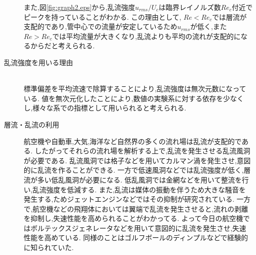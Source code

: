 \begin{description}
  また,図\ref{fig:graph2.eps}から,乱流強度$u_{rms}/U_c$は臨界レイノルズ数$Re_c$付近でピークを持っていることがわかる.
  この理由として, $Re<Re_c$では層流が支配的であり,管中心での流量が安定しているため$u_{rms}$が低く,また$Re>Re_c$では平均流量が大きくなり,乱流よりも平均の流れが支配的になるからだと考えられる.
  \item[乱流強度を用いる理由]\mbox{}\\
  標準偏差を平均流速で除算することにより,乱流強度は無次元数になっている.
  値を無次元化したことにより,数値の実験系に対する依存を少なくし,様々な系での指標として用いられると考えられる. 
  \item[層流・乱流の利用]
  航空機や自動車,大気,海洋など自然界の多くの流れ場は乱流が支配的である.
  したがってそれらの流れ場を解析する上で,乱流を発生させる乱流風洞が必要である\cite{2002409}.
  乱流風洞では格子などを用いてカルマン渦を発生させ,意図的に乱流を作ることができる.
  一方で低速風洞などでは乱流強度が低く,層流が多い低乱風洞が必要になる\cite{1986KJ00001465850}.
  低乱風洞では金網などを用いて整流を行い,乱流強度を低減する.
  また,乱流は媒体の振動を伴うため大きな騒音を発生する,ためジェットエンジンなどではその抑制が研究されている\cite{1995354}.
  一方で,航空機などの飛翔体においては翼端で乱流を発生させると,流れの剥離を抑制し,失速性能を高められることがわかってる.
  よって今日の航空機ではボルテックスジェネレータなどを用いて意図的に乱流を発生させ,失速性能を高めている\cite{199322}.
  同様のことはゴルフボールのディンプルなどで経験的に知られていた.
\end{description}